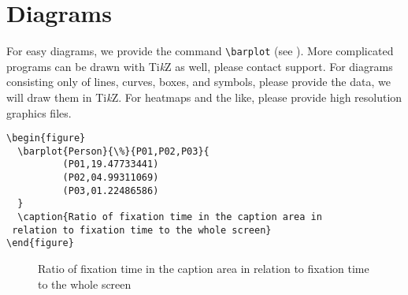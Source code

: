 \section{Diagrams}

For easy diagrams, we provide the command \verb+\barplot+ (see ). More complicated programs can be drawn with Ti\textit{k}Z as well, please contact support. For diagrams consisting only of lines, curves, boxes, and symbols, please provide the data, we will draw them in Ti\textit{k}Z. For heatmaps and the like, please provide high resolution graphics files. 



\begin{verbatim}
\begin{figure} 
  \barplot{Person}{\%}{P01,P02,P03}{
	      (P01,19.47733441) 
	      (P02,04.99311069) 
	      (P03,01.22486586)
  }
  \caption{Ratio of fixation time in the caption area in
 relation to fixation time to the whole screen}
\end{figure}
\end{verbatim}

\begin{figure} 
  \caption{Ratio of fixation time in the caption area in relation to fixation time to the whole screen}
  \label{fig:barplot}
\end{figure}

 

